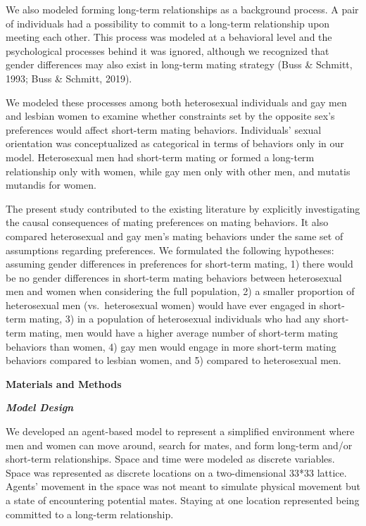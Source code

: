 \documentclass[
  12pt,
]{article}
\begin{document}
We also modeled forming long-term relationships as a background process.
A pair of individuals had a possibility to commit to a long-term
relationship upon meeting each other. This process was modeled at a
behavioral level and the psychological processes behind it was ignored,
although we recognized that gender differences may also exist in
long-term mating strategy (Buss \& Schmitt, 1993; Buss \& Schmitt,
2019).

We modeled these processes among both heterosexual individuals and gay
men and lesbian women to examine whether constraints set by the opposite
sex's preferences would affect short-term mating behaviors. Individuals'
sexual orientation was conceptualized as categorical in terms of
behaviors only in our model. Heterosexual men had short-term mating or
formed a long-term relationship only with women, while gay men only with
other men, and mutatis mutandis for women.

The present study contributed to the existing literature by explicitly
investigating the causal consequences of mating preferences on mating
behaviors. It also compared heterosexual and gay men's mating behaviors
under the same set of assumptions regarding preferences. We formulated
the following hypotheses: assuming gender differences in preferences for
short-term mating, 1) there would be no gender differences in short-term
mating behaviors between heterosexual men and women when considering the
full population, 2) a smaller proportion of heterosexual men
(vs.~heterosexual women) would have ever engaged in short-term mating,
3) in a population of heterosexual individuals who had any short-term
mating, men would have a higher average number of short-term mating
behaviors than women, 4) gay men would engage in more short-term mating
behaviors compared to lesbian women, and 5) compared to heterosexual
men.

\vspace{5mm}

\textbf{Materials and Methods}

\textbf{\emph{Model Design}}

We developed an agent-based model to represent a simplified environment
where men and women can move around, search for mates, and form
long-term and/or short-term relationships. Space and time were modeled
as discrete variables. Space was represented as discrete locations on a
two-dimensional 33*33 lattice. Agents' movement in the space was not
meant to simulate physical movement but a state of encountering
potential mates. Staying at one location represented being committed to
a long-term relationship.
\end{document}

